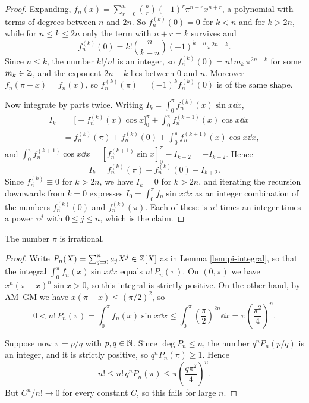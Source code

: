 \documentclass[a4paper]{scrartcl}
\begin{document}
\begin{proof}
	Expanding, $f_n(x) = \sum_{r=0}^n\binom{n}{r}(-1)^r\pi^{n-r}x^{n+r}$, a polynomial with terms of degrees between $n$ and $2n$. So $f_n^{(k)}(0) = 0$ for $k<n$ and for $k>2n$, while for $n\leq k\leq 2n$ only the term with $n+r = k$ survives and
	$$f_n^{(k)}(0) = k!\binom{n}{k-n}(-1)^{k-n}\pi^{2n-k}.$$
	Since $n\leq k$, the number $k!/n!$ is an integer, so $f_n^{(k)}(0) = n!\,m_k\,\pi^{2n-k}$ for some $m_k \in \mathbb{Z}$, and the exponent $2n-k$ lies between $0$ and $n$. Moreover $f_n(\pi-x) = f_n(x)$, so $f_n^{(k)}(\pi) = (-1)^kf_n^{(k)}(0)$ is of the same shape.

	Now integrate by parts twice. Writing $I_k = \int_0^\pi f_n^{(k)}(x)\sin x\dd x$,
	\begin{align*}
		I_k &= \Big[-f_n^{(k)}(x)\cos x\Big]_0^\pi + \int_0^\pi f_n^{(k+1)}(x)\cos x \dd x \\
		&= f_n^{(k)}(\pi)+f_n^{(k)}(0) + \int_0^\pi f_n^{(k+1)}(x)\cos x\dd x,
	\end{align*}
	and $\int_0^\pi f_n^{(k+1)}\cos x\dd x = \left[f_n^{(k+1)}\sin x\right]_0^\pi - I_{k+2} = -I_{k+2}$. Hence
	$$I_k = f_n^{(k)}(\pi)+f_n^{(k)}(0) - I_{k+2}.$$
	Since $f_n^{(k)}\equiv0$ for $k>2n$, we have $I_k = 0$ for $k>2n$, and iterating the recursion downwards from $k=0$ expresses $I_0 = \int_0^\pi f_n\sin x\dd x$ as an integer combination of the numbers $f_n^{(k)}(0)$ and $f_n^{(k)}(\pi)$. Each of these is $n!$ times an integer times a power $\pi^j$ with $0\leq j\leq n$, which is the claim.
\end{proof}

\begin{theorem}\label{thm:pi-irrational}
	The number $\pi$ is irrational.
\end{theorem}

\begin{proof}
	Write $P_n(X) = \sum_{j=0}^na_jX^j\in\mathbb{Z}[X]$ as in Lemma \ref{lem:pi-integral}, so that the integral $\int_0^\pi f_n(x)\sin x\dd x$ equals $n!\,P_n(\pi)$. On $(0,\pi)$ we have $x^n(\pi-x)^n\sin x > 0$, so this integral is strictly positive. On the other hand, by AM--GM we have $x(\pi-x)\leq(\pi/2)^2$, so
	$$0 < n!\,P_n(\pi) = \int_0^\pi f_n(x)\sin x\dd x \leq \int_0^\pi\left(\frac\pi2\right)^{2n}\dd x = \pi\left(\frac{\pi^2}{4}\right)^{n}.$$

	Suppose now $\pi = p/q$ with $p,q\in\mathbb{N}$. Since $\deg P_n\leq n$, the number $q^nP_n(p/q)$ is an integer, and it is strictly positive, so $q^nP_n(\pi)\geq1$. Hence
	$$n! \leq n!\,q^nP_n(\pi) \leq \pi\left(\frac{q\pi^2}{4}\right)^n.$$
	But $C^n/n!\to0$ for every constant $C$, so this fails for large $n$.
\end{proof}
\end{document}
